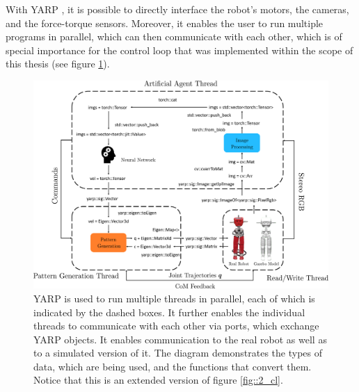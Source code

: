 \FloatBarrier
\label{sec::6_co}
With YARP \cite{metta2006yarp}, it is possible to directly interface the robot's motors, the cameras, and the force-torque sensors. Moreover, it enables the user to run multiple programs in parallel, which can then communicate with each other, which is of special importance for the control loop that was implemented within the scope of this thesis (see figure \ref{fig::341_yarp}).
\begin{figure}[h!]
	\hspace*{-1cm}
	\includegraphics[scale=.4]{chapters/06_implementation_of_the_walking_pattern_generator/img/yarp_diag.png}
	\caption{YARP is used to run multiple threads in parallel, each of which is indicated by the dashed boxes. It further enables the individual threads to communicate with each other via ports, which exchange YARP objects. It enables communication to the real robot as well as to a simulated version of it. The diagram demonstrates the types of data, which are being used, and the functions that convert them. Notice that this is an extended version of figure \ref{fig::2_cl}.}
	\label{fig::341_yarp}
\end{figure}
